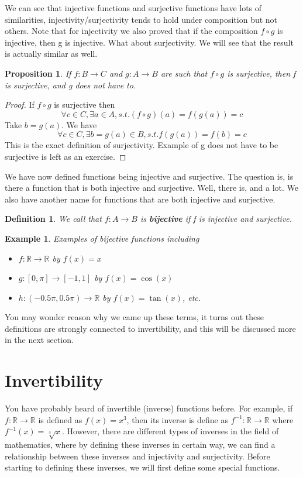 \documentclass{book}
\newtheorem{definition}[theorem]{Definition}
\newtheorem{example}[theorem]{Example}
\newtheorem{proposition}[theorem]{Proposition}
\begin{document}
We can see that injective functions and surjective functions have lots of similarities, injectivity/surjectivity tends to hold under composition but not others. Note that for injectivity we also proved that if the composition $f \circ g$ is injective, then g is injective. What about surjectivity. We will see that the result is actually similar as well.

\begin{proposition}
    If $f : B \rightarrow C$ and $g : A \rightarrow B$ are such that $f \circ g$ is surjective, then f is surjective, and g does not have to.
\end{proposition}

\begin{proof}
    If $f \circ g$ is surjective then
    $$\forall c \in C, \exists a \in A, s.t. (f \circ g)(a) = f(g(a)) = c$$
    Take $b = g(a)$. We have
    $$\forall c \in C, \exists b = g(a) \in B, s.t. f(g(a)) = f(b) = c$$
    This is the exact definition of surjectivity.
    Example of g does not have to be surjective is left as an exercise.
\end{proof}

We have now defined functions being injective and surjective. The question is, is there a function that is both injective and surjective. Well, there is, and a lot. We also have another name for functions that are both injective and surjective.
\begin{definition}
    We call that $f : A \rightarrow B$ is \textbf{bijective} if f is injective and surjective.
\end{definition}

\begin{example}
    Examples of bijective functions including
    \begin{itemize}[itemsep = 0pt]
        \item $f : \mathbb{R} \rightarrow \mathbb{R}$ by $f(x) = x$
        \item $g : [0, \pi] \rightarrow [-1, 1]$ by $f(x) = \cos(x)$
        \item $h : (-0.5\pi, 0.5\pi) \rightarrow \mathbb{R}$ by $f(x) = \tan(x)$, etc.
    \end{itemize}
\end{example}

You may wonder reason why we came up these terms, it turns out these definitions are strongly connected to invertibility, and this will be discussed more in the next section.

\section{Invertibility}
You have probably heard of invertible (inverse) functions before. For example, if $f : \mathbb{R} \rightarrow \mathbb{R}$ is defined as $f(x) = x^{3}$, then its inverse is define as $f^{-1} : \mathbb{R} \rightarrow \mathbb{R}$ where $f^{-1}(x) = \sqrt[3]{x}$. However, there are different types of inverses in the field of mathematics, where by defining these inverses in certain way, we can find a relationship between these inverses and injectivity and surjectivity. Before starting to defining these inverses, we will first define some special functions.
\end{document}
